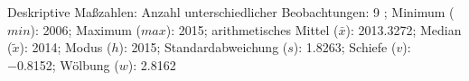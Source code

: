 				\label{tableValues:mres042d}
				\vspace*{-\baselineskip}
                    \begin{noten}
                	    \note{} Deskriptive Maßzahlen:
                	    Anzahl unterschiedlicher Beobachtungen: 9%
                	    ; 
                	      Minimum ($min$): 2006; 
                	      Maximum ($max$): 2015; 
                	      arithmetisches Mittel ($\bar{x}$): \num[round-mode=places,round-precision=2]{2013.3272}; 
                	      Median ($\tilde{x}$): 2014; 
                	      Modus ($h$): 2015; 
                	      Standardabweichung ($s$): \num[round-mode=places,round-precision=2]{1.8263}; 
                	      Schiefe ($v$): \num[round-mode=places,round-precision=2]{-0.8152}; 
                	      Wölbung ($w$): \num[round-mode=places,round-precision=2]{2.8162}
                     \end{noten}

